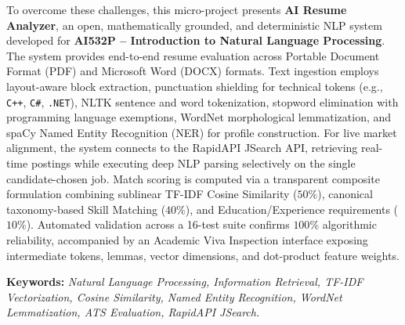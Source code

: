 \documentclass[11pt,a4paper]{article}
\begin{document}
To overcome these challenges, this micro-project presents \textbf{AI Resume Analyzer}, an open, mathematically grounded, and deterministic NLP system developed for \textbf{AI532P -- Introduction to Natural Language Processing}. The system provides end-to-end resume evaluation across Portable Document Format (PDF) and Microsoft Word (DOCX) formats. Text ingestion employs layout-aware block extraction, punctuation shielding for technical tokens (e.g., \texttt{C++}, \texttt{C\#}, \texttt{.NET}), NLTK sentence and word tokenization, stopword elimination with programming language exemptions, WordNet morphological lemmatization, and spaCy Named Entity Recognition (NER) for profile construction. For live market alignment, the system connects to the RapidAPI JSearch API, retrieving real-time postings while executing deep NLP parsing selectively on the single candidate-chosen job. Match scoring is computed via a transparent composite formulation combining sublinear TF-IDF Cosine Similarity ($50\%$), canonical taxonomy-based Skill Matching ($40\%$), and Education/Experience requirements ($10\%$). Automated validation across a 16-test suite confirms $100\%$ algorithmic reliability, accompanied by an Academic Viva Inspection interface exposing intermediate tokens, lemmas, vector dimensions, and dot-product feature weights.

\vspace{0.3cm}
\noindent\textbf{Keywords:} \textit{Natural Language Processing, Information Retrieval, TF-IDF Vectorization, Cosine Similarity, Named Entity Recognition, WordNet Lemmatization, ATS Evaluation, RapidAPI JSearch.}

\vspace{0.4cm}
\end{document}
